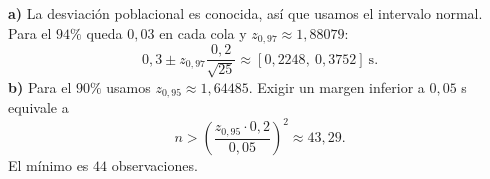 \textbf{a)} La desviación poblacional es conocida, así que usamos el intervalo normal. Para el $94\%$ queda $0{,}03$ en cada cola y $z_{0{,}97}\approx1{,}88079$:
\[
0{,}3\pm z_{0{,}97}\frac{0{,}2}{\sqrt{25}}
\approx\boxed{[0{,}2248,\ 0{,}3752]}\ \text{s}.
\]
\textbf{b)} Para el $90\%$ usamos $z_{0{,}95}\approx1{,}64485$. Exigir un margen inferior a $0{,}05$ s equivale a
\[
n>\left(\frac{z_{0{,}95}\cdot0{,}2}{0{,}05}\right)^2\approx43{,}29.
\]
El mínimo es $\boxed{44}$ observaciones.
